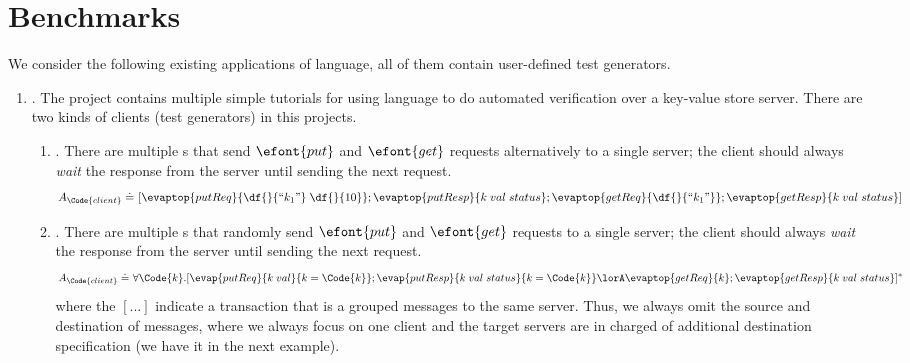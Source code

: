 \section{Benchmarks}

We consider the following existing applications of  language, all of them contain user-defined test generators.
\begin{enumerate}
    \item {}. The project contains multiple simple tutorials for using  language to do automated verification over a key-value store server. There are two kinds of clients (test generators) in this projects.
    \begin{enumerate}
        \item {}. There are multiple s that send $\efont{put}$ and $\efont{get}$ requests alternatively to a single server; the client should always \emph{wait} the response from the server until sending the next request.
        {\small\begin{align*}
        A_\Code{client} \doteq&\ [\evaptop{putReq}{\df{}{``k_1"}\;\df{}{10}};\evaptop{putResp}{k\;val\;status}; \evaptop{getReq}{\df{}{``k_1"}};\evaptop{getResp}{k\;val\;status}]
    \end{align*}}\noindent
        \item {}. There are multiple s that randomly send $\efont{put}$ and $\efont{get}$ requests to a single server; the client should always \emph{wait} the response from the server until sending the next request.
        {\small\begin{align*}
        A_\Code{client} \doteq&\ \forall \Code{k}.[\evap{putReq}{k\;val}{k =\Code{k}};\evap{putResp}{k\;val\;status}{k =\Code{k}} \lorA \evaptop{getReq}{k};\evaptop{getResp}{k\;val\;status}]^*
    \end{align*}}\noindent
    where the $[...]$ indicate a transaction that is a grouped messages to the same server. Thus, we always omit the source and destination of messages, where we always focus on one client and the target servers are in charged of additional destination specification (we have it in the next example).
    \end{enumerate}

\end{enumerate}
